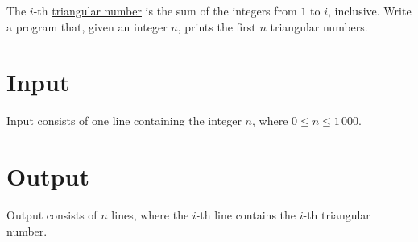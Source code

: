 
The $i$-th \href{https.//en.wikipedia.org/wiki/Triangular_number}{triangular number} is the sum of the integers from $1$ to $i$, inclusive.
Write a program that, given an integer $n$, prints the first $n$ triangular numbers.

\section*{Input}
Input consists of one line containing the integer $n$, where $0 \leq n \leq 1\,000$.

\section*{Output}
Output consists of $n$ lines, where the $i$-th line contains the $i$-th triangular number.
